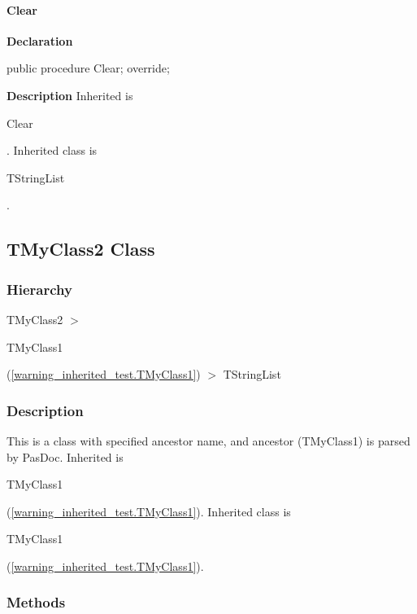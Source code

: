\documentclass{report}
\begin{document}
\paragraph*{Clear}\hspace*{\fill}

\begin{list}{}{
\setlength{\itemindent}{0cm}
\setlength{\listparindent}{0cm}
\setlength{\leftmargin}{\evensidemargin}
\addtolength{\leftmargin}{\tmplength}
\settowidth{\labelsep}{X}
\addtolength{\leftmargin}{\labelsep}
\setlength{\labelwidth}{\tmplength}
}
\begin{flushleft}
\item[\textbf{Declaration}\hfill]
\begin{ttfamily}
public procedure Clear; override;\end{ttfamily}


\end{flushleft}
\par
\item[\textbf{Description}]
Inherited is \begin{ttfamily}Clear\end{ttfamily}. Inherited class is \begin{ttfamily}TStringList\end{ttfamily}.

\end{list}
\subsection*{TMyClass2 Class}
\subsubsection*{\large{\textbf{Hierarchy}}\normalsize\hspace{1ex}\hfill}
TMyClass2 {$>$} \begin{ttfamily}TMyClass1\end{ttfamily}(\ref{warning_inherited_test.TMyClass1}) {$>$} 
TStringList
\subsubsection*{\large{\textbf{Description}}\normalsize\hspace{1ex}\hfill}
This is a class with specified ancestor name, and ancestor (TMyClass1) is parsed by PasDoc. Inherited is \begin{ttfamily}TMyClass1\end{ttfamily}(\ref{warning_inherited_test.TMyClass1}). Inherited class is \begin{ttfamily}TMyClass1\end{ttfamily}(\ref{warning_inherited_test.TMyClass1}).\subsubsection*{\large{\textbf{Methods}}\normalsize\hspace{1ex}\hfill}
\end{document}
